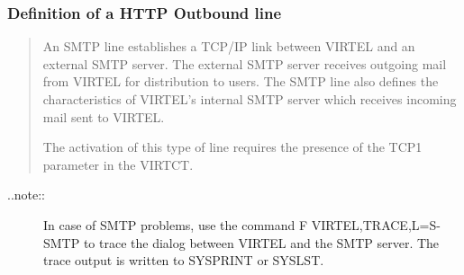 \documentclass[letterpaper,10pt,english]{sphinxmanual}
\begin{document}
\subsubsection{Definition of a HTTP Outbound line}
\label{\detokenize{connectivity_guide:definition-of-a-http-outbound-line}}\begin{quote}

An SMTP line establishes a TCP/IP link between VIRTEL and an external SMTP server. The external SMTP server receives outgoing
mail from VIRTEL for distribution to users. The SMTP line also defines the characteristics of VIRTEL’s internal SMTP server which
receives incoming mail sent to VIRTEL.

The activation of this type of line requires the presence of the TCP1 parameter in the VIRTCT.
\end{quote}
\begin{description}
\item[{..note::}] \leavevmode
In case of SMTP problems, use the command F VIRTEL,TRACE,L=S-SMTP to trace the dialog between VIRTEL and the SMTP server. The trace output is written to SYSPRINT or SYSLST.

\end{description}

\end{document}
